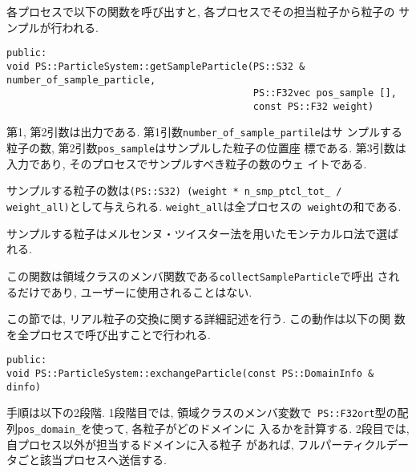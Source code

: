 
各プロセスで以下の関数を呼び出すと, 各プロセスでその担当粒子から粒子の
サンプルが行われる.
\begin{screen}
\begin{verbatim}
public:
void PS::ParticleSystem::getSampleParticle(PS::S32 & number_of_sample_particle,
                                           PS::F32vec pos_sample [],
                                           const PS::F32 weight)
\end{verbatim}
\end{screen}

第1, 第2引数は出力である. 第1引数{\tt number\_of\_sample\_partile}はサ
ンプルする粒子の数, 第2引数{\tt pos\_sample}はサンプルした粒子の位置座
標である. 第3引数は入力であり, そのプロセスでサンプルすべき粒子の数のウェ
イトである.

サンプルする粒子の数は{\tt (PS::S32) (weight * n\_smp\_ptcl\_tot\_ /
weight\_all)}として与えられる. {\tt weight\_all}は全プロセスの{\tt
weight}の和である.

サンプルする粒子はメルセンヌ・ツイスター法を用いたモンテカルロ法で選ば
れる.

この関数は領域クラスのメンバ関数である{\tt collectSampleParticle}で呼出
されるだけであり, ユーザーに使用されることはない.



この節では, リアル粒子の交換に関する詳細記述を行う. この動作は以下の関
数を全プロセスで呼び出すことで行われる.
\begin{screen}
\begin{verbatim}
public:
void PS::ParticleSystem::exchangeParticle(const PS::DomainInfo & dinfo)
\end{verbatim}
\end{screen}


手順は以下の2段階. 1段階目では, 領域クラスのメンバ変数で{\tt
PS::F32ort}型の配列{\tt pos\_domain\_}を使って, 各粒子がどのドメインに
入るかを計算する. 2段目では, 自プロセス以外が担当するドメインに入る粒子
があれば, フルパーティクルデータごと該当プロセスへ送信する.

